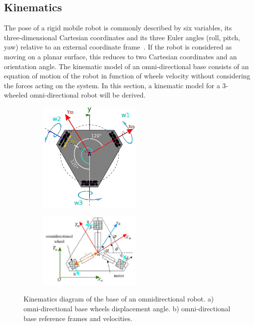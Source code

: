 \subsection{Kinematics}\label{sec:kinematics}




The pose of a rigid mobile robot is commonly described by six variables, its three-dimensional Cartesian coordinates and its three Euler angles (roll, pitch, yaw) relative to an external coordinate frame~\cite{thrun_probabilistic_2005}. If the robot is considered as moving on a planar surface, this reduces to two Cartesian coordinates and an orientation angle.
The kinematic model of an omni-directional base consists of an equation of motion of the robot in function of wheels velocity without considering the forces acting on the system. In this section, a kinematic model for a 3-wheeled omni-directional robot will be derived.

\begin{figure}[H]
  \centering
  \begin{subfigure}[b]{0.5\textwidth}
     \centering
      \includegraphics[width=5cm]{images/03-foundation/triskarbase1}
	\caption{}
	\label{triskar1} 
  \end{subfigure}
  \begin{subfigure}[b]{0.5\textwidth}
  \centering
      \includegraphics[width=5cm]{images/03-foundation/triskarbase2}
	\caption{}
	\label{triskar2} 
  \end{subfigure}
  \caption{Kinematics diagram of the base of an omnidirectional robot. a) omni-directional base wheels displacement angle. b) omni-directional base reference frames and velocities.}
\end{figure}

